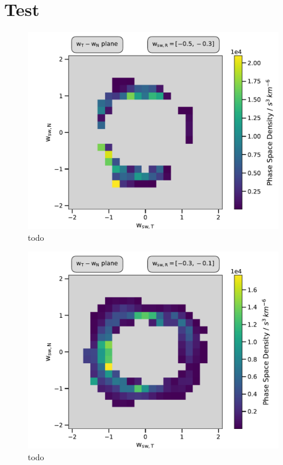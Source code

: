
\chapter{Test} %

\label{AppendixX} %



\begin{figure}[h]
	\includegraphics[width=1.\textwidth]{Figures/slices_50_-5.pdf}
	\centering
	\caption{todo}
	\label{fig:todo}
\end{figure}

\begin{figure}[h]
	\includegraphics[width=1.\textwidth]{Figures/slices_50_-3.pdf}
	\centering
	\caption{todo}
	\label{fig:todo}
\end{figure}

